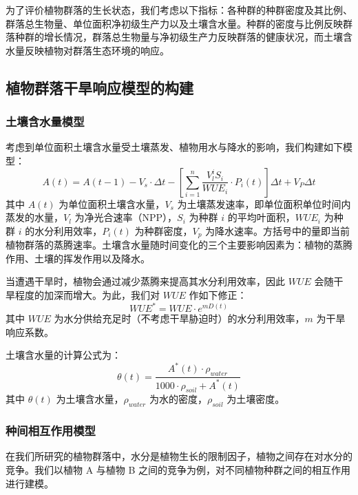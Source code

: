 \documentclass[11pt,a4paper]{ctexart}
\begin{document}
为了评价植物群落的生长状态，我们考虑以下指标：各种群的种群密度及其比例、群落总生物量、单位面积净初级生产力以及土壤含水量。种群的密度与比例反映群落种群的增长情况，群落总生物量与净初级生产力反映群落的健康状况，而土壤含水量反映植物对群落生态环境的响应。

\subsection{植物群落干旱响应模型的构建}

\subsubsection{土壤含水量模型}

考虑到单位面积土壤含水量受土壤蒸发、植物用水与降水的影响，我们构建如下模型：
\begin{equation}
A(t)=A(t-1)-V_s\cdot\Delta t-\left[\sum_{i=1}^{n}\frac{V_l^{i}S_i}{WUE_i}\cdot P_i(t)\right]\Delta t+V_P\Delta t
\end{equation}
其中 $A(t)$ 为单位面积土壤含水量，$V_s$ 为土壤蒸发速率，即单位面积单位时间内蒸发的水量，$V_l$ 为净光合速率（NPP），$S_i$ 为种群 $i$ 的平均叶面积，$WUE_i$ 为种群 $i$ 的水分利用效率，$P_i(t)$ 为种群密度，$V_p$ 为降水速率。方括号中的量即当前植物群落的蒸腾速率。土壤含水量随时间变化的三个主要影响因素为：植物的蒸腾作用、土壤的挥发作用以及降水。

当遭遇干旱时，植物会通过减少蒸腾来提高其水分利用效率，因此 $WUE$ 会随干旱程度的加深而增大。为此，我们对 $WUE$ 作如下修正：
\begin{equation}
WUE^{*}=WUE\cdot e^{mD(t)}
\end{equation}
其中 $WUE$ 为水分供给充足时（不考虑干旱胁迫时）的水分利用效率，$m$ 为干旱响应系数。

土壤含水量的计算公式为：
\begin{equation}
\theta(t)=\frac{A^{*}(t)\cdot\rho_{water}}{1000\cdot\rho_{soil}+A^{*}(t)}
\end{equation}
其中 $\theta(t)$ 为土壤含水量，$\rho_{water}$ 为水的密度，$\rho_{soil}$ 为土壤密度。

\subsubsection{种间相互作用模型}

在我们所研究的植物群落中，水分是植物生长的限制因子，植物之间存在对水分的竞争。我们以植物 A 与植物 B 之间的竞争为例，对不同植物种群之间的相互作用进行建模。
\end{document}
